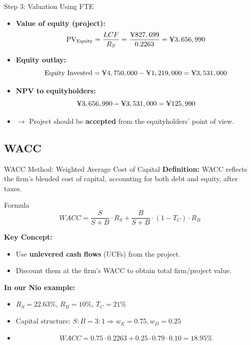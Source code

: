 \begin{frame}{Step 3: Valuation Using FTE}
	
	\begin{itemize}
		\item \textbf{Value of equity (project):}
		\[
		\text{PV}_{\text{Equity}} = \frac{LCF}{R_S} = \frac{\text{\textyen}827,699}{0.2263} = \text{\textyen}3,656,990
		\]
		
		\item \textbf{Equity outlay:}
		\[
		\text{Equity Invested} = \text{\textyen} 4,750,000 - \text{\textyen}1,219,000 = \text{\textyen}3,531,000
		\]
		
		\item \textbf{NPV to equityholders:}
		\[
		\text{\textyen}3,656,990 - \text{\textyen}3,531,000 = \text{\textyen}125,990
		\]
		
		\item $\rightarrow$ Project should be \textbf{accepted} from the equityholders’ point of view.
	\end{itemize}
	
\end{frame}
\subsection{WACC}
\begin{frame}{WACC Method: Weighted Average Cost of Capital}
	\textbf{Definition:}  
	WACC reflects the firm's blended cost of capital, accounting for both debt and equity, after taxes.
	\begin{block}{Formula}
		\[
		WACC = \frac{S}{S + B} \cdot R_S + \frac{B}{S + B} \cdot (1 - T_C) \cdot R_B
		\]
	\end{block}
	
	\textbf{Key Concept:}
	\begin{itemize}
		\item Use \textbf{unlevered cash flows} (UCFs) from the project.
		\item Discount them at the firm’s WACC to obtain total firm/project value.
	\end{itemize}
	\textbf{In our Nio example:}
	\begin{itemize}
		\item \( R_S = 22.63\% \), \( R_B = 10\% \), \( T_C = 21\% \)
		\item Capital structure: \( S:B = 3:1 \Rightarrow w_E = 0.75, w_D = 0.25 \)
		\item \[
		WACC = 0.75 \cdot 0.2263 + 0.25 \cdot 0.79 \cdot 0.10 = 18.95\%
		\]
	\end{itemize}
\end{frame}

